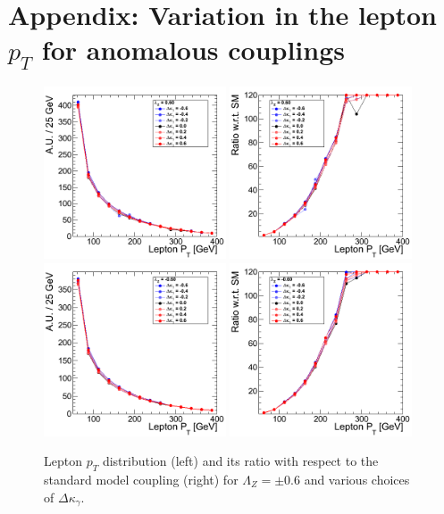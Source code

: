 \section{Appendix: Variation in the lepton \texorpdfstring{$p_T$}{pT} for anomalous couplings}
\begin{figure}[h!t]
  {\centering
    \includegraphics[width=0.48\textwidth]{figs/LeptonpT_060.png}
    \includegraphics[width=0.48\textwidth]{figs/LeptonpT_060_ratio.png}
    \includegraphics[width=0.48\textwidth]{figs/LeptonpT_m060.png}
    \includegraphics[width=0.48\textwidth]{figs/LeptonpT_m060_ratio.png}
    \caption{Lepton $p_T$ distribution (left) and its ratio with respect to 
    the standard model coupling (right) for $\Lambda_Z = \pm 0.6$ and various choices of $\Delta{\kappa_\gamma}$.}
    \label{fig:ww_LeptonpT_atgcRatio06}}
\end{figure}
